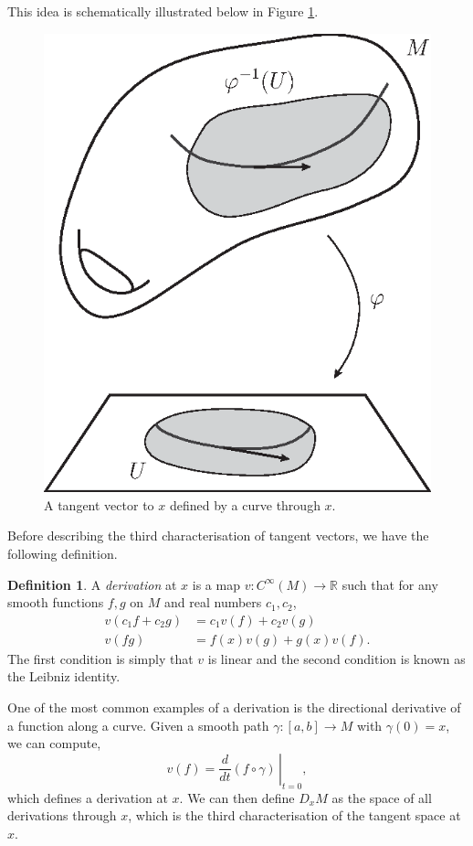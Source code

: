 \documentclass[12pt,a4paper]{article}
\numberwithin{equation}{section}
\theoremstyle{definition}
\newtheorem{definition}{Definition}[section]
\theoremstyle{remark}
\begin{document}
This idea is schematically illustrated below in Figure \ref{fig:tang-1}. 

\begin{figure}[h!]
\centering
\includegraphics[scale=0.75]{fig/tang-3b}
\caption{A tangent vector to $x$ defined by a curve through $x$.}
\label{fig:tang-1}
\end{figure}

Before describing the third characterisation of tangent vectors, we have the following definition.
\begin{definition}
\label{def:derivation}
A \textit{derivation} at $x$ is a map $v:C^{\infty}(M)\to\mathbb{R}$ such that for any smooth functions $f,g$ on $M$ and real numbers $c_1,c_2$,
\begin{align*}
v(c_1f+c_2g)&=c_1v(f)+c_2v(g)\\
v(fg)&=f(x)v(g)+g(x)v(f).
\end{align*}
The first condition is simply that $v$ is linear and the second condition is known as the Leibniz identity.
\end{definition}
One of the most common examples of a derivation is the directional derivative of a function along a curve. Given a smooth path $\gamma:[a,b]\to M$ with $\gamma(0)=x$, we can compute,
\begin{equation}
v(f)=\left.\frac{d}{dt}(f\circ\gamma)\,\right\rvert_{t=0},
\label{eq:derivation-dirderiv}
\end{equation}
which defines a derivation at $x$. We can then define $D_xM$ as the space of all derivations through $x$, which is the third characterisation of the tangent space at $x$.
\end{document}
